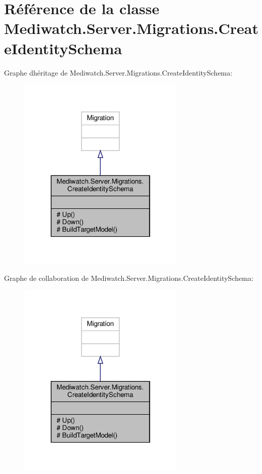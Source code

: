 \hypertarget{class_mediwatch_1_1_server_1_1_migrations_1_1_create_identity_schema}{}\section{Référence de la classe Mediwatch.\+Server.\+Migrations.\+Create\+Identity\+Schema}
\label{class_mediwatch_1_1_server_1_1_migrations_1_1_create_identity_schema}


Graphe d\textquotesingle{}héritage de Mediwatch.\+Server.\+Migrations.\+Create\+Identity\+Schema\+:
\nopagebreak
\begin{figure}[H]
\begin{center}
\leavevmode
\includegraphics[width=226pt]{class_mediwatch_1_1_server_1_1_migrations_1_1_create_identity_schema__inherit__graph}
\end{center}
\end{figure}


Graphe de collaboration de Mediwatch.\+Server.\+Migrations.\+Create\+Identity\+Schema\+:
\nopagebreak
\begin{figure}[H]
\begin{center}
\leavevmode
\includegraphics[width=226pt]{class_mediwatch_1_1_server_1_1_migrations_1_1_create_identity_schema__coll__graph}
\end{center}
\end{figure}
